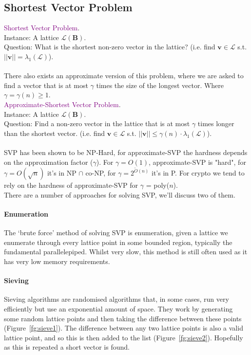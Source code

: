 \documentclass[a4paper, 11pt, openany]{book}
\numberwithin{equation}{section}
\theoremstyle{plain}
\theoremstyle{definition}
\newcommand{\Define}[1]{\textcolor{purple}{#1}}
\begin{document}
\subsection{Shortest Vector Problem} 
\Define{Shortest Vector Problem}.
\\
Instance: A lattice $\mathcal{L}(\textbf{B})$.
\\
Question: What is the shortest non-zero vector in the lattice? (i.e. find $\textbf{v} \in \mathcal{L}$ s.t. $||\textbf{v}|| = \lambda_1(\mathcal{L})$).
\\
~\\
There also exists an approximate version of this problem, where we are asked to find a vector that is at most $\gamma$ times the size of the longest vector. Where $\gamma = \gamma(n) \geq 1$.
\\
\Define{Approximate-Shortest Vector Problem}.
\\
Instance: A lattice $\mathcal{L}(\textbf{B})$.
\\
Question: Find a non-zero vector in the lattice that is at most $\gamma$ times longer than the shortest vector. (i.e. find $\textbf{v} \in \mathcal{L}$ s.t. $||\textbf{v}|| \leq \gamma(n)\cdot\lambda_1(\mathcal{L})$).
\\
~\\
SVP has been shown to be NP-Hard, for approximate-SVP the hardness depends on the approximation factor ($\gamma$). For $\gamma = O(1)$, approximate-SVP is "hard", for $\gamma = O(\sqrt{n})$ it's in NP $\cap$ co-NP, for $\gamma = 2^{\tilde{O}(n)}$ it's in P. For crypto we tend to rely on the hardness of approximate-SVP for $\gamma$ = poly($n$).
\\
There are a number of approaches for solving SVP, we'll discuss two of them.
\paragraph{Enumeration} The `brute force' method of solving SVP is enumeration, given a lattice we enumerate through every lattice point in some bounded region, typically the fundamental parallelepiped. Whilst very slow, this method is still often used as it has very low memory requirements.
\paragraph{Sieving} Sieving algorithms are randomised algorithms that, in some cases, run very efficiently but use an exponential amount of space. They work by generating some random lattice points and then taking the difference between these points (Figure~\ref{fg:sieve1}). The difference between any two lattice points is also a valid lattice point, and so this is then added to the list (Figure~\ref{fg:sieve2}). Hopefully as this is repeated a short vector is found.
\end{document}
